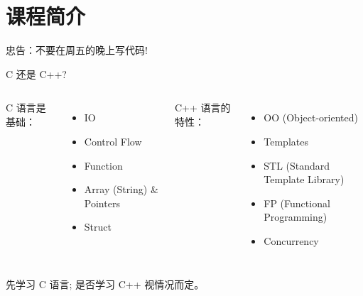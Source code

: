 \section{课程简介}

\begin{frame}{忠告：不要在周五的晚上写代码!}
\end{frame}



\begin{frame}{C 还是 C++?}
  \begin{columns}
      C 语言是基础：
      \begin{itemize}
	\item IO
	\item Control Flow
	\item Function
	\item Array (String) \& Pointers
	\item Struct
      \end{itemize}
      C++ 语言的特性：
      \begin{itemize}
	\item OO (Object-oriented)
	\item Templates
	\item STL (Standard Template Library)
	\item FP (Functional Programming)
	\item Concurrency
      \end{itemize}
  \end{columns}

  \vspace{1.00cm}
  \centerline{先学习 C 语言; 是否学习 C++ 视情况而定。}
\end{frame}

